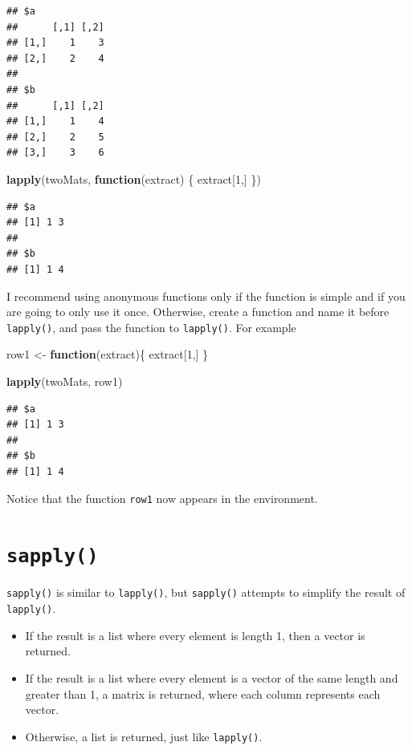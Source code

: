 \documentclass[
]{book}
\newenvironment{Shaded}{\begin{snugshade}}{\end{snugshade}}
\newcommand{\ControlFlowTok}[1]{\textcolor[rgb]{0.13,0.29,0.53}{\textbf{#1}}}
\newcommand{\DecValTok}[1]{\textcolor[rgb]{0.00,0.00,0.81}{#1}}
\newcommand{\FunctionTok}[1]{\textcolor[rgb]{0.13,0.29,0.53}{\textbf{#1}}}
\newcommand{\NormalTok}[1]{#1}
\newcommand{\OtherTok}[1]{\textcolor[rgb]{0.56,0.35,0.01}{#1}}
\providecommand{\tightlist}{%
  \setlength{\itemsep}{0pt}\setlength{\parskip}{0pt}}
\theoremstyle{definition}
\theoremstyle{definition}
\theoremstyle{definition}
\theoremstyle{definition}
\theoremstyle{remark}
\begin{document}
\begin{verbatim}
## $a
##      [,1] [,2]
## [1,]    1    3
## [2,]    2    4
## 
## $b
##      [,1] [,2]
## [1,]    1    4
## [2,]    2    5
## [3,]    3    6
\end{verbatim}

\begin{Shaded}
\begin{Highlighting}[]
\FunctionTok{lapply}\NormalTok{(twoMats, }\ControlFlowTok{function}\NormalTok{(extract) \{ extract[}\DecValTok{1}\NormalTok{,] \})}
\end{Highlighting}
\end{Shaded}

\begin{verbatim}
## $a
## [1] 1 3
## 
## $b
## [1] 1 4
\end{verbatim}

I recommend using anonymous functions only if the function is simple and if you are going to only use it once. Otherwise, create a function and name it before \texttt{lapply()}, and pass the function to \texttt{lapply()}. For example

\begin{Shaded}
\begin{Highlighting}[]
\NormalTok{row1 }\OtherTok{\textless{}{-}} \ControlFlowTok{function}\NormalTok{(extract)\{}
\NormalTok{  extract[}\DecValTok{1}\NormalTok{,]}
\NormalTok{\}}

\FunctionTok{lapply}\NormalTok{(twoMats, row1)}
\end{Highlighting}
\end{Shaded}

\begin{verbatim}
## $a
## [1] 1 3
## 
## $b
## [1] 1 4
\end{verbatim}

Notice that the function \texttt{row1} now appears in the environment.

\hypertarget{sapply}{%
\section{\texorpdfstring{\texttt{sapply()}}{sapply()}}\label{sapply}}

\texttt{sapply()} is similar to \texttt{lapply()}, but \texttt{sapply()} attempts to simplify the result of \texttt{lapply()}.

\begin{itemize}
\tightlist
\item
  If the result is a list where every element is length 1, then a vector is returned.
\item
  If the result is a list where every element is a vector of the same length and greater than 1, a matrix is returned, where each column represents each vector.
\item
  Otherwise, a list is returned, just like \texttt{lapply()}.
\end{itemize}
\end{document}
